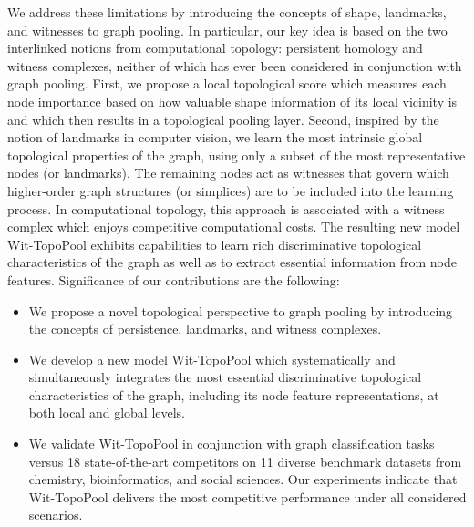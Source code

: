 \documentclass[letterpaper]{article} %
\begin{document}
We address these limitations by introducing the concepts of shape, landmarks, and witnesses  to graph pooling. In particular, our key idea is based on the two interlinked notions from computational topology: persistent homology and witness complexes, neither of which has ever been considered in conjunction with graph pooling. First, we propose a local topological score which measures each node importance based on how valuable shape information of its local vicinity is and which then results in a topological pooling layer. Second, inspired by the notion of landmarks in computer vision, we learn the most intrinsic global topological properties of the graph, using only a subset of the most representative nodes (or landmarks).
The remaining nodes act as witnesses that govern which higher-order graph structures (or simplices) are to be included into the learning process. In computational topology, this approach is associated with a witness complex which enjoys competitive computational costs. The resulting new model Wit-TopoPool exhibits capabilities to learn rich discriminative topological characteristics of the graph as well as to extract essential information from node features. Significance of our contributions are the following:
\begin{itemize}[leftmargin=*]
\item We propose a novel topological perspective to graph pooling by introducing the concepts of persistence, landmarks, and witness complexes.

\item We develop a new model Wit-TopoPool which systematically and simultaneously integrates the most essential discriminative topological characteristics of the graph, including its node feature representations, at both local and global levels.

\item We validate Wit-TopoPool in conjunction with graph classification tasks versus 18 state-of-the-art competitors on 11 diverse benchmark datasets from chemistry, bioinformatics, and social sciences. 
Our experiments indicate that Wit-TopoPool delivers the most competitive performance under all considered scenarios.

\end{itemize}



\end{document}
